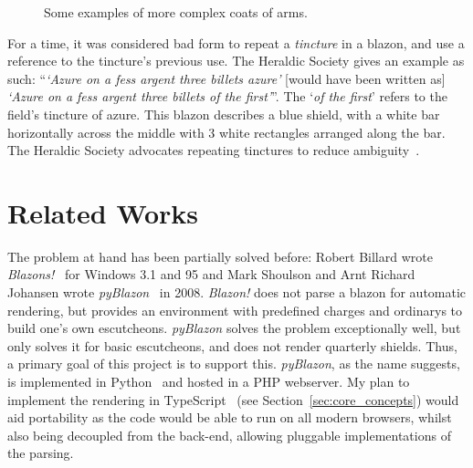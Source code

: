 \documentclass[nobib, a4paper, twoside, justified]{tufte-book}
\makeatletter
\newcommand{\charges}{\glspl{charge}\@\xspace}
\newcommand{\blazon}{\gls{blazon}\@\xspace}
\makeatother
\begin{document}
\begin{figure}[h]
  \qquad
  \caption{Some examples of more complex coats of arms.}\label{fig:complex_shields}
\end{figure}

For a time, it was considered bad form to repeat a \textit{tincture} in a \blazon, and use a
reference to the tincture's previous use. The Heraldic Society gives an example as such:
``\textit{`Azure on a fess argent three billets azure'} [would have been written as] \textit{`Azure
on a fess argent three billets of the first'}''. The `\textit{of the first}' refers to the field's
tincture of azure. This \blazon describes a blue shield, with a white bar horizontally across the
middle with 3 white rectangles arranged along the bar. The Heraldic Society advocates repeating
tinctures to reduce ambiguity~\autocite{blazon_in_coa}.

\section{Related Works}%
\label{sec:related_works}

The problem at hand has been partially solved before: Robert Billard wrote
\textit{Blazons!}~\autocite{dos_blazon} for Windows 3.1 and 95 and Mark Shoulson and Arnt Richard
Johansen wrote \textit{pyBlazon}~\autocite{pyblazon} in 2008. \textit{Blazon!} does not parse a
blazon for automatic rendering, but provides an environment with predefined \charges and
\glspl{ordinary} to build one's own \glspl{escutcheon}. \textit{pyBlazon} solves the problem
exceptionally well, but only solves it for basic escutcheons, and does not render quarterly
shields. Thus, a primary goal of this project is to support this. \textit{pyBlazon}, as the name
suggests, is implemented in Python~\autocite{python} and hosted in a PHP webserver. My plan to implement the
rendering in TypeScript~\autocite{typescript} (see Section~\ref{sec:core_concepts}) would aid portability as the code
would be able to run on all modern browsers, whilst also being decoupled from the back-end,
allowing pluggable implementations of the parsing.
\end{document}
